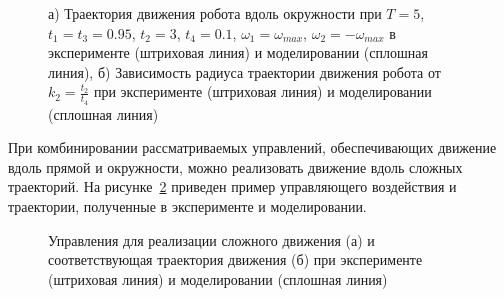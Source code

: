 \begin{figure}[!ht]
	\begin{minipage}[h]{0.5\linewidth}
	\end{minipage}
	\hfill
	\begin{minipage}[h]{0.5\linewidth}
	\end{minipage}
	\caption{а) Траектория движения робота вдоль окружности при $T = 5$, $t_1 = t_3 = 0.95$, $t_2 = 3$, $t_4 = 0.1$, $\omega_1 = \omega_{max}$, $\omega_2 = -\omega_{max}$ в эксперименте (штриховая линия) и моделировании (сплошная линия), б) Зависимость радиуса траектории движения робота от $k_2 = \frac{t_2}{t_4}$ при эксперименте (штриховая линия) и моделировании (сплошная линия)}
	\label{ControlActionOur}
\end{figure}




При комбинировании рассматриваемых управлений, обеспечивающих движение вдоль прямой и окружности, можно реализовать движение вдоль сложных траекторий. На рисунке~\ref{Slalom} приведен пример управляющего воздействия и траектории, полученные в эксперименте и моделировании.

\begin{figure}[!ht]
	\begin{minipage}[h]{0.5\linewidth}
	\end{minipage}
	\hfill
	\begin{minipage}[h]{0.5\linewidth}
	\end{minipage}
	\caption{Управления для реализации сложного движения (а) и соответствующая траектория движения (б)  при эксперименте (штриховая линия) и моделировании (сплошная линия)}
	\label{Slalom}
\end{figure}

